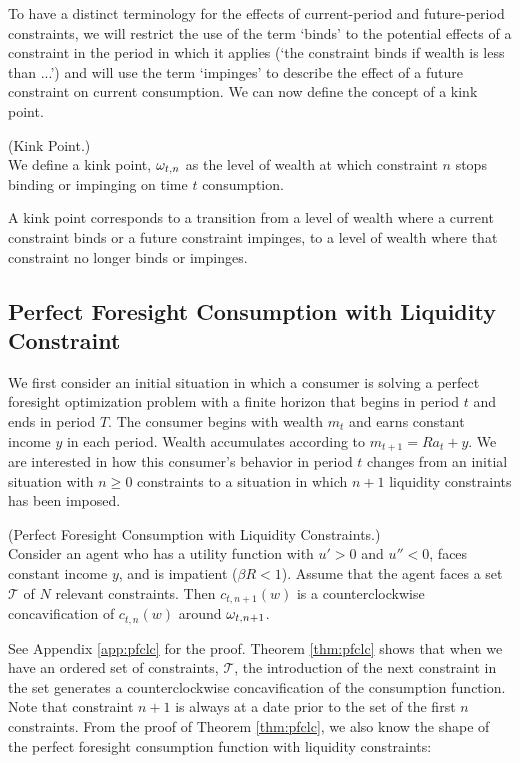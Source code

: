 To have a distinct terminology for the effects of current-period and future-period constraints, we will restrict the use of the term `binds' to the potential effects of a constraint in the period in which it applies (`the constraint binds if wealth is less than ...') and will use the term `impinges' to describe the effect of a future constraint on current consumption. We can now define the concept of a kink point.
\begin{defn}(Kink Point.) \\
	We define a kink point, $\omega_{t,n}$ as the level of wealth at which constraint $n$ stops binding or impinging on time $t$ consumption.
\end{defn}
A kink point corresponds to a transition from a level of wealth where a current constraint binds or a future constraint impinges, to a level of wealth where that constraint no longer binds or impinges.



\subsection{Perfect Foresight Consumption with Liquidity Constraint}\label{subsec:Piecewise}

We first consider an initial situation in which a consumer is solving a perfect foresight optimization problem with a finite horizon that begins in period $t$ and ends in period $T$. The consumer begins with wealth ${m}_{t}$ and earns constant income ${y}$ in each period. Wealth accumulates according to ${m}_{t+1} = R{a}_{t}+{y}$. We are interested in how this consumer's behavior in period $t$ changes from an initial situation with $n\geq 0$ constraints to a situation in which $n+1$ liquidity constraints has been imposed.

\begin{theorem}\label{thm:pfclc}(Perfect Foresight Consumption with Liquidity Constraints.) \\
	Consider an agent who has a utility function with $u'> 0 $ and $u'' < 0$, faces constant income ${y}$, and is impatient ($\beta R < 1$). Assume that the agent faces a set $\mathcal{T}$ of $N$ relevant constraints. Then $c_{t,n+1}(w)$ is a counterclockwise concavification of $c_{t,n}(w)$ around $\omega_{t,n+1}$.
\end{theorem}

See Appendix \ref{app:pfclc} for the proof. Theorem \ref{thm:pfclc} shows that when we have an ordered set of constraints, $\mathcal{T}$, the introduction of the next constraint in the set generates a counterclockwise concavification of the consumption function. Note that constraint $n+1$ is always at a date prior to the set of the first $n$ constraints. From the proof of Theorem \ref{thm:pfclc}, we also know the shape of the perfect foresight consumption function with liquidity constraints:

